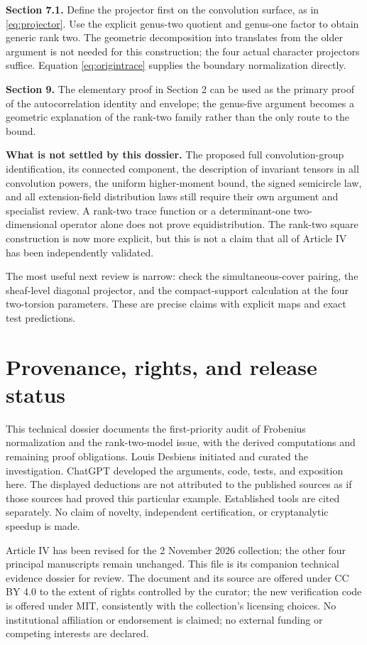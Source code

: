 \documentclass[11pt,a4paper]{article}
\numberwithin{equation}{section}
\begin{document}
\textbf{Section 7.1.} Define the projector first on the convolution surface, as in \eqref{eq:projector}. Use the explicit genus-two quotient and genus-one factor to obtain generic rank two. The geometric decomposition into translates from the older argument is not needed for this construction; the four actual character projectors suffice. Equation \eqref{eq:origintrace} supplies the boundary normalization directly.

\textbf{Section 9.} The elementary proof in Section 2 can be used as the primary proof of the autocorrelation identity and envelope; the genus-five argument becomes a geometric explanation of the rank-two family rather than the only route to the bound.

\textbf{What is not settled by this dossier.} The proposed full convolution-group identification, its connected component, the description of invariant tensors in all convolution powers, the uniform higher-moment bound, the signed semicircle law, and all extension-field distribution laws still require their own argument and specialist review. A rank-two trace function or a determinant-one two-dimensional operator alone does not prove equidistribution. The rank-two square construction is now more explicit, but this is not a claim that all of Article IV has been independently validated.

The most useful next review is narrow: check the simultaneous-cover pairing, the sheaf-level diagonal projector, and the compact-support calculation at the four two-torsion parameters. These are precise claims with explicit maps and exact test predictions.

\section*{Provenance, rights, and release status}
This technical dossier documents the first-priority audit of Frobenius normalization and the rank-two-model issue, with the derived computations and remaining proof obligations. Louis Desbiens initiated and curated the investigation. ChatGPT developed the arguments, code, tests, and exposition here. The displayed deductions are not attributed to the published sources as if those sources had proved this particular example. Established tools are cited separately. No claim of novelty, independent certification, or cryptanalytic speedup is made.

Article IV has been revised for the 2 November 2026 collection; the other four principal manuscripts remain unchanged. This file is its companion technical evidence dossier for review. The document and its source are offered under CC BY 4.0 to the extent of rights controlled by the curator; the new verification code is offered under MIT, consistently with the collection's licensing choices. No institutional affiliation or endorsement is claimed; no external funding or competing interests are declared.
\end{document}
